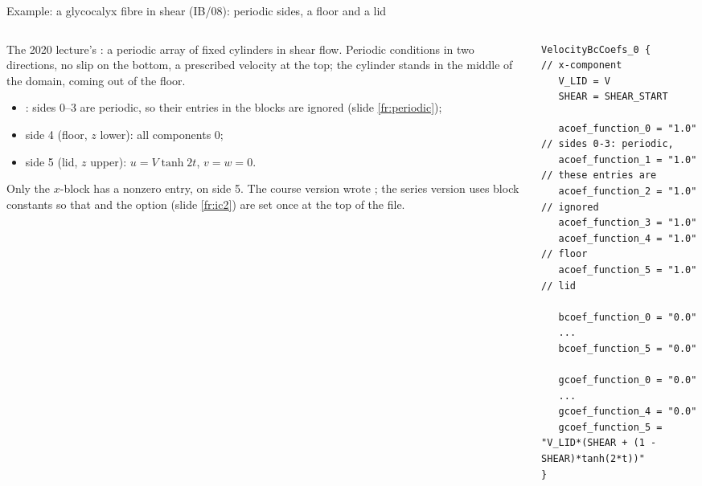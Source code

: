 \documentclass[aspectratio=169,11pt]{beamer}
\begin{document}
\begin{frame}[fragile]{Example: a glycocalyx fibre in shear (IB/08): periodic sides, a floor and a lid}
\label{fr:ib08}
\begin{columns}[T,onlytextwidth]
\begin{column}{0.5\textwidth}
\footnotesize The 2020 lecture's : a periodic array of fixed cylinders in shear flow. Periodic conditions in two directions, no slip on the bottom, a prescribed velocity at the top; the cylinder stands in the middle of the domain, coming out of the floor.
\begin{itemize}
  \item {}: sides 0--3 are periodic, so their entries in the blocks are ignored (slide \ref{fr:periodic});
  \item side 4 (floor, $z$ lower): all components $0$;
  \item side 5 (lid, $z$ upper): $u = V\tanh 2t$, $v = w = 0$.
\end{itemize}
\footnotesize Only the $x$-block has a nonzero entry, on side 5. The course version wrote ; the series version uses block constants so that  and the option  (slide \ref{fr:ic2}) are set once at the top of the file.
\end{column}
\begin{column}{0.48\textwidth}
\begin{lstlisting}[style=inputtiny]
VelocityBcCoefs_0 {         // x-component
   V_LID = V
   SHEAR = SHEAR_START

   acoef_function_0 = "1.0"    // sides 0-3: periodic,
   acoef_function_1 = "1.0"    // these entries are
   acoef_function_2 = "1.0"    // ignored
   acoef_function_3 = "1.0"
   acoef_function_4 = "1.0"    // floor
   acoef_function_5 = "1.0"    // lid

   bcoef_function_0 = "0.0"
   ...
   bcoef_function_5 = "0.0"

   gcoef_function_0 = "0.0"
   ...
   gcoef_function_4 = "0.0"
   gcoef_function_5 = "V_LID*(SHEAR + (1 - SHEAR)*tanh(2*t))"
}
\end{lstlisting}
\end{column}
\end{columns}
\end{frame}
\end{document}

